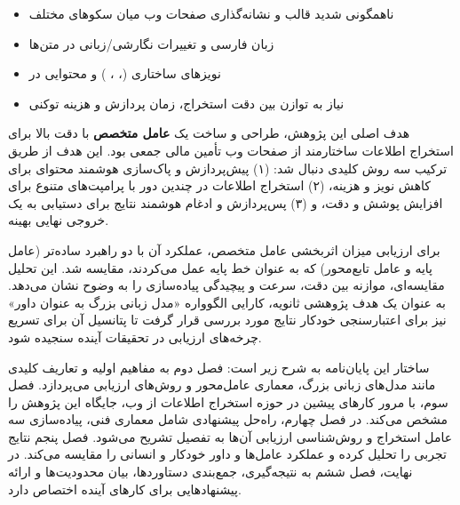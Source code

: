 
\begin{itemize}
\item ناهمگونی شدید قالب و نشانه‌گذاری صفحات وب میان سکو‌های مختلف
\item زبان فارسی و تغییرات نگارشی/زبانی در متن‌ها
\item نویزهای ساختاری (، ، ) و محتوایی در 
\item نیاز به توازن بین دقت استخراج، زمان پردازش و هزینه توکنی
\end{itemize}


هدف اصلی این پژوهش، طراحی و ساخت یک \textbf{عامل متخصص} با دقت بالا برای استخراج اطلاعات ساختارمند از صفحات وب تأمین مالی جمعی بود. این هدف از طریق ترکیب سه روش کلیدی دنبال شد: (۱) پیش‌پردازش و پاک‌سازی هوشمند محتوای  برای کاهش نویز و هزینه، (۲) استخراج اطلاعات در چندین دور با پرامپت‌های متنوع برای افزایش پوشش و دقت، و (۳) پس‌پردازش و ادغام هوشمند نتایج برای دستیابی به یک خروجی نهایی بهینه.

\noindent
برای ارزیابی میزان اثربخشی عامل متخصص، عملکرد آن با دو راهبرد ساده‌تر (عامل پایه و عامل تابع‌محور) که به عنوان خط پایه عمل می‌کردند، مقایسه شد. این تحلیل مقایسه‌ای، موازنه بین دقت، سرعت و پیچیدگی پیاده‌سازی را به وضوح نشان می‌دهد. به عنوان یک هدف پژوهشی ثانویه، کارایی الگوواره «مدل زبانی بزرگ به عنوان داور» نیز برای اعتبارسنجی خودکار نتایج مورد بررسی قرار گرفت تا پتانسیل آن برای تسریع چرخه‌های ارزیابی در تحقیقات آینده سنجیده شود.

ساختار این پایان‌نامه به شرح زیر است: فصل دوم به مفاهیم اولیه و تعاریف کلیدی مانند مدل‌های زبانی بزرگ، معماری عامل‌محور و روش‌های ارزیابی می‌پردازد. فصل سوم، با مرور کارهای پیشین در حوزه استخراج اطلاعات از وب، جایگاه این پژوهش را مشخص می‌کند. در فصل چهارم، راه‌حل پیشنهادی شامل معماری فنی، پیاده‌سازی سه عامل استخراج و روش‌شناسی ارزیابی آن‌ها به تفصیل تشریح می‌شود. فصل پنجم نتایج تجربی را تحلیل کرده و عملکرد عامل‌ها و داور خودکار و انسانی را مقایسه می‌کند. در نهایت، فصل ششم به نتیجه‌گیری، جمع‌بندی دستاوردها، بیان محدودیت‌ها و ارائه پیشنهادهایی برای کارهای آینده اختصاص دارد.